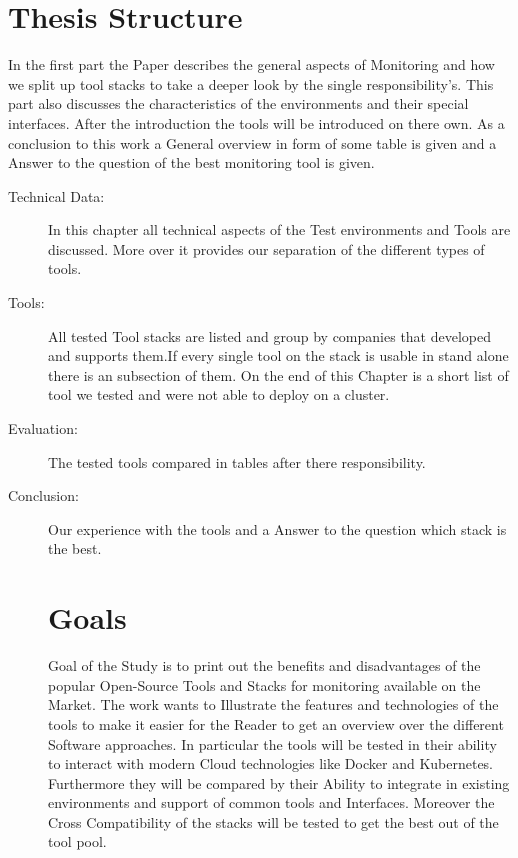 \section*{Thesis Structure}
In the first part the Paper describes the general aspects of Monitoring and how we split up tool stacks to take a deeper look by the single responsibility's. This part also discusses the characteristics of the environments and their special interfaces. After the introduction the tools will be introduced on there own. As a conclusion to this work a General overview in form of some table is given and a Answer to the question of the best monitoring tool is given. 
\begin{description}
\item[Technical Data:] In this chapter all technical aspects of the Test environments and Tools are discussed. More over it provides our separation of the different types of tools. 
\item[Tools:] All tested Tool stacks are listed and group by companies that developed and supports them.If every single tool on the stack is usable in stand alone there is an subsection of them. On the end of this Chapter is a short list of tool we tested and were not able to deploy on a cluster.
\item[Evaluation:]The tested tools compared in tables after there responsibility.
\item[Conclusion:] Our experience with the tools and a Answer to the question which stack is the best.
\section*{Goals}
Goal of the Study is to print out the benefits and disadvantages of the popular Open-Source Tools and Stacks  for monitoring available on the Market. The work wants to Illustrate the features and technologies of the tools to make it easier for the Reader to get an overview over the different Software approaches. In particular the tools will be tested in their ability to interact with modern Cloud technologies like Docker and Kubernetes. Furthermore they will be compared by their Ability to integrate in existing environments and support of common tools and Interfaces. Moreover the Cross Compatibility of the stacks will be tested to get the best out of the tool pool.
\end{description}
